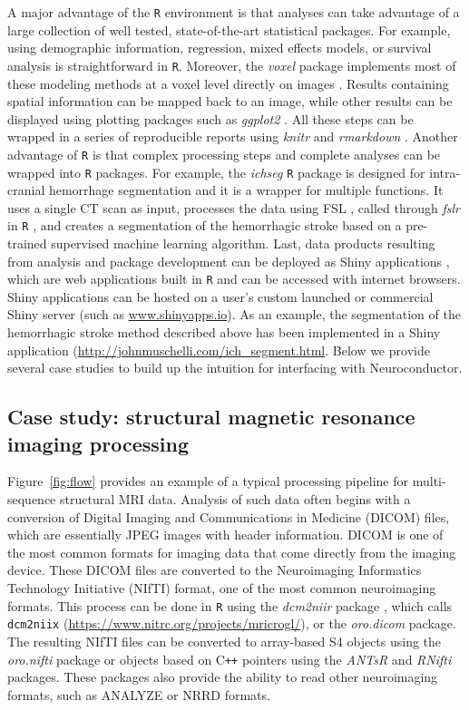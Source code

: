 \documentclass[]{elsarticle} %
\newcommand{\pkg}[1]{\emph{#1}}
\newcommand{\rlang}{\texttt{R}}
\begin{document}
A major advantage of the {\rlang} environment is that analyses can take advantage of a large collection of well tested,  state-of-the-art statistical packages. For example, using demographic information, regression, mixed effects models, or survival analysis is straightforward in {\rlang}.  Moreover, the \pkg{voxel} package implements most of these modeling methods at a voxel level directly on images \citep{voxel}.  Results containing spatial information can be mapped back to an image, while other results can be displayed using plotting packages such as \pkg{ggplot2} \citep{ggplot2}.  All these steps can be wrapped in a series of reproducible reports using \pkg{knitr} and \pkg{rmarkdown} \citep{rmarkdown,knitr}. Another advantage of {\rlang} is that complex processing steps and complete analyses can be wrapped into {\rlang} packages. For example, the \pkg{ichseg} \cite{ichseg,muschelli2016pitch} {\rlang} package is designed for intra-cranial hemorrhage segmentation and it is a wrapper for multiple functions. It uses a  single CT scan as input, processes the data using FSL \citep{fsl}, called through \pkg{fslr} in {\rlang} \citep{fslr}, and creates a segmentation of the hemorrhagic stroke based on a pre-trained supervised machine learning algorithm. Last, data products resulting from analysis and package development can be deployed as Shiny applications \citep{shiny}, which are web applications built in {\rlang} and can be accessed with internet browsers.  Shiny applications can be hosted on a user's custom launched or commercial Shiny server (such as \url{www.shinyapps.io}).  As an example, the segmentation of the hemorrhagic stroke method described above has been implemented in a Shiny application (\url{http://johnmuschelli.com/ich_segment.html}. Below we provide several case studies to build up the intuition for interfacing with Neuroconductor.

\subsection{Case study: structural magnetic resonance imaging processing} Figure~\ref{fig:flow} provides an example of a typical processing pipeline for multi-sequence structural MRI data. Analysis of such data often begins with a conversion of Digital Imaging and Communications in Medicine (DICOM) files, which are essentially JPEG images with header information.  DICOM is one of the most common formats for imaging data that come directly from the imaging device.  These DICOM files are converted to the Neuroimaging Informatics Technology Initiative (NIfTI) format, one of the most common neuroimaging formats. This process can be done in {\rlang} using the \pkg{dcm2niir} package \citep{dcm2niir}, which calls \texttt{dcm2niix} (\url{https://www.nitrc.org/projects/mricrogl/}), or the \pkg{oro.dicom} \cite{oro.nifti} package. The resulting NIfTI files can be converted to array-based S4 objects  using the \pkg{oro.nifti} \cite{oro.nifti} package or objects based on C\texttt{++} pointers using the \pkg{ANTsR} \cite{antsr} and \pkg{RNifti} \cite{Rnifti} packages.  These packages also provide the ability to read other neuroimaging formats, such as ANALYZE or NRRD formats.
 
\end{document}
